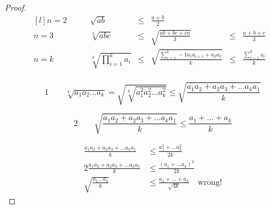 \begin{proof}
	\begin{equation}
		\begin{aligned}[l]
			n=2\qquad & \sqrt{ab}      &\le& \frac{a+b}{2} & & \\
			n=3\qquad & \sqrt[3]{abc}  &\le& \sqrt{\frac{ab+bc+ca}{3}}   &\le& \frac{a+b+c}{3}\\
			n=k\qquad & \sqrt[k]{\prod_{i=1}^k a_i}       &\le& \sqrt{\frac{\sum_{i=1}^k-1a_ia_{i+1} + a_ka_1}{k}} &\le& \frac{\sum_{i=1}^ka_i}{k} &\\
		\end{aligned}
	\end{equation}
	
	\begin{equation}
		\text{1} \qquad
		\sqrt[k]{a_1a_2\dots a_k} = \sqrt{\sqrt[k]{a_1^2a_2^2\dots a_k^2}}\le\sqrt{\frac{a_1a_2+a_2a_3+\dots a_ka_1}{k}}
	\end{equation}
	
	\begin{equation}
		\text{2} \qquad
		\sqrt{\frac{a_1a_2+a_2a_3+\dots a_ka_1}{k}} \leqslant \frac{a_1+\dots + a_k}{k}
	\end{equation}
	
	\begin{equation}
		\begin{aligned}
			\frac{a_1a_2+a_2a_3+\dots a_ka_1}{k} &\leqslant \frac{a_1^2 + \dots a_k^2}{2k}\\
			2\frac{a_1a_2+a_2a_3+\dots a_ka_1}{k} &\leqslant \frac{(a_1 + \dots a_k)^2}{2k}\\
			\sqrt{\frac{a_1\dots a_k}{k}} &\leqslant \frac{a_1+\dots +a_k}{\sqrt{4k}}\quad\text{wrong!}
		\end{aligned}
	\end{equation}
	
	
	
\end{proof}
